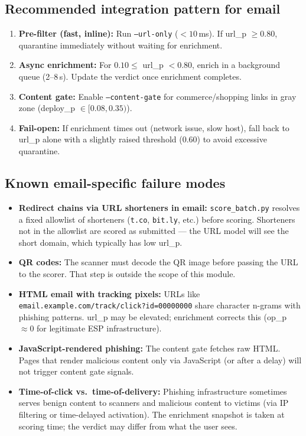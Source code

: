 \documentclass[11pt,a4paper]{article}
\newcommand{\code}[1]{\texttt{#1}}
\begin{document}
\subsection*{Recommended integration pattern for email}

\begin{enumerate}
  \item \textbf{Pre-filter (fast, inline):} Run \code{--url-only}
        ($< 10$\,ms). If url\_p $\geq 0.80$, quarantine immediately
        without waiting for enrichment.
  \item \textbf{Async enrichment:} For $0.10 \leq$ url\_p $< 0.80$,
        enrich in a background queue (2--8\,s). Update the verdict
        once enrichment completes.
  \item \textbf{Content gate:} Enable \code{--content-gate} for
        commerce/shopping links in gray zone (deploy\_p
        $\in [0.08, 0.35)$).
  \item \textbf{Fail-open:} If enrichment times out (network issue,
        slow host), fall back to url\_p alone with a slightly
        raised threshold (0.60) to avoid excessive quarantine.
\end{enumerate}

\subsection*{Known email-specific failure modes}

\begin{itemize}[noitemsep]
  \item \textbf{Redirect chains via URL shorteners in email:}
        \code{score\_batch.py} resolves a fixed allowlist of
        shorteners (\code{t.co}, \code{bit.ly}, etc.) before scoring.
        Shorteners not in the allowlist are scored as submitted ---
        the URL model will see the short domain, which typically has
        low url\_p.
  \item \textbf{QR codes:} The scanner must decode the QR image
        before passing the URL to the scorer. That step is outside
        the scope of this module.
  \item \textbf{HTML email with tracking pixels:} URLs like
        \code{email.example.com/track/click?id=00000000} share
        character n-grams with phishing patterns. url\_p may be
        elevated; enrichment corrects this (op\_p $\approx 0$ for
        legitimate ESP infrastructure).
  \item \textbf{JavaScript-rendered phishing:} The content gate
        fetches raw HTML. Pages that render malicious content only
        via JavaScript (or after a delay) will not trigger content
        gate signals.
  \item \textbf{Time-of-click vs.\ time-of-delivery:} Phishing
        infrastructure sometimes serves benign content to scanners
        and malicious content to victims (via IP filtering or
        time-delayed activation). The enrichment snapshot is taken
        at scoring time; the verdict may differ from what the user
        sees.
\end{itemize}
\end{document}
